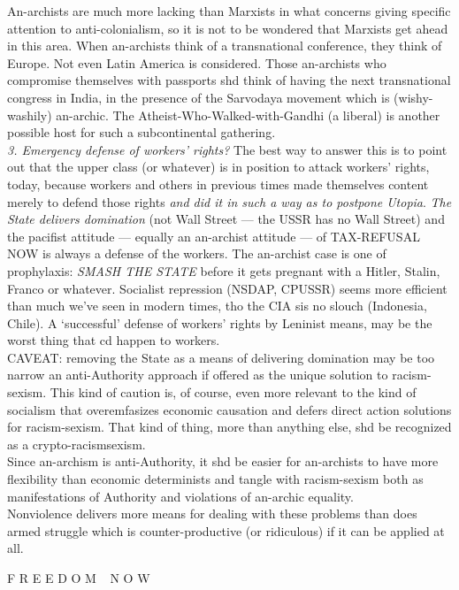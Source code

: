 An-archists are much more lacking than Marxists in what concerns giving specific attention to anti-colonialism, so it is not to be wondered that Marxists get ahead in this area. When an-archists think of a transnational conference, they think of Europe. Not even Latin America is considered. Those an-archists who compromise themselves with passports shd think of having the next transnational congress in India, in the presence of the Sarvodaya movement which is (wishy-washily) an-archic. The Atheist-Who-Walked-with-Gandhi (a liberal) is another possible host for such a subcontinental gathering.\\
\emph{3. Emergency defense of workers' rights?} The best way to answer this is to point out that the upper class (or whatever) is in position to attack workers' rights, today, because workers and others in previous times made themselves content merely to defend those rights \emph{and did it in such a way as to postpone Utopia}. \emph{The State delivers domination} (not Wall Street --- the USSR has no Wall Street) and the pacifist attitude --- equally an an-archist attitude --- of TAX-REFUSAL NOW is always a defense of the workers. The an-archist case is one of prophylaxis: \emph{SMASH THE STATE} before it gets pregnant with a Hitler, Stalin, Franco or whatever. Socialist repression (NSDAP, CPUSSR) seems more efficient than much we've seen in modern times, tho the CIA sis no slouch (Indonesia, Chile). A `successful' defense of workers' rights by Leninist means, may be the worst thing that cd happen to workers.\\
CAVEAT: removing the State as a means of delivering domination may be too narrow an anti-Authority approach if offered as the unique solution to racism-sexism. This kind of caution is, of course, even more relevant to the kind of socialism that overemfasizes economic causation and defers direct action solutions for racism-sexism. That kind of thing, more than anything else, shd be recognized as a crypto-racismsexism.\\
Since an-archism is anti-Authority, it shd be easier for an-archists to have more flexibility than economic determinists and tangle with racism-sexism both as manifestations of Authority and violations of an-archic equality.\\
Nonviolence delivers more means for dealing with these problems than does armed struggle which is counter-productive (or ridiculous) if it can be applied at all.
\begin{center}
F R E E D O M $\;\,$ N O W
\end{center}